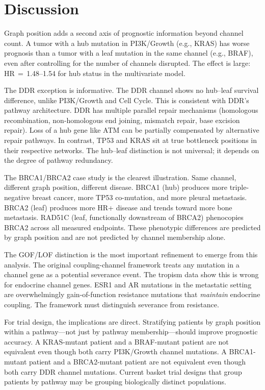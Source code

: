 \documentclass[11pt]{article}
\begin{document}
\section{Discussion}
\label{sec:discussion}

Graph position adds a second axis of prognostic information beyond
channel count. A tumor with a hub mutation in PI3K/Growth (e.g., KRAS)
has worse prognosis than a tumor with a leaf mutation in the same
channel (e.g., BRAF), even after controlling for the number of
channels disrupted. The effect is large: HR\,$=$\,1.48--1.54 for
hub status in the multivariate model.

The DDR exception is informative. The DDR channel shows no hub--leaf
survival difference, unlike PI3K/Growth and Cell Cycle. This is
consistent with DDR's pathway architecture. DDR has multiple
parallel repair mechanisms (homologous recombination, non-homologous
end joining, mismatch repair, base excision repair). Loss of a hub
gene like ATM can be partially compensated by alternative repair
pathways. In contrast, TP53 and KRAS sit at true bottleneck
positions in their respective networks. The hub--leaf distinction
is not universal; it depends on the degree of pathway redundancy.

The BRCA1/BRCA2 case study is the clearest illustration. Same
channel, different graph position, different disease. BRCA1 (hub)
produces more triple-negative breast cancer, more TP53 co-mutation,
and more pleural metastasis. BRCA2 (leaf) produces more HR+ disease
and trends toward more bone metastasis. RAD51C (leaf, functionally
downstream of BRCA2) phenocopies BRCA2 across all measured
endpoints. These phenotypic differences are predicted by graph
position and are not predicted by channel membership alone.

The GOF/LOF distinction is the most important refinement to emerge
from this analysis. The original coupling-channel framework treats
any mutation in a channel gene as a potential severance event. The
tropism data show this is wrong for endocrine channel genes. ESR1
and AR mutations in the metastatic setting are overwhelmingly
gain-of-function resistance mutations that \emph{maintain} endocrine
coupling. The framework must distinguish severance from resistance.

For trial design, the implications are direct. Stratifying patients
by graph position within a pathway---not just by pathway
membership---should improve prognostic accuracy. A KRAS-mutant
patient and a BRAF-mutant patient are not equivalent even though
both carry PI3K/Growth channel mutations. A BRCA1-mutant patient
and a BRCA2-mutant patient are not equivalent even though both
carry DDR channel mutations. Current basket trial designs that group
patients by pathway may be grouping biologically distinct populations.
\end{document}
